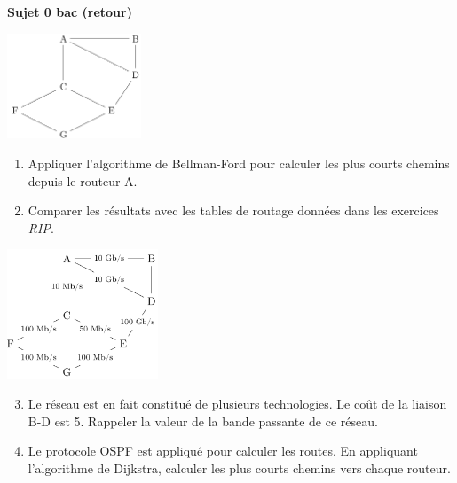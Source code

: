 \documentclass[a4paper,11pt]{article}
\begin{document}
\begin{exo}\textbf{Sujet 0 bac (retour)}\\
\begin{center}
\centering
\includegraphics[width=4cm]{ressources/exo-bac.png}
\end{center}
\begin{enumerate}
    \item Appliquer l'algorithme de Bellman-Ford pour calculer les plus courts chemins depuis le routeur A.
    \item Comparer les résultats avec les tables de routage données dans les exercices \emph{RIP}.
\end{enumerate}
\begin{center}
    \centering
    \includegraphics[width=4.5cm]{ressources/bacblanc.png}
    \end{center}
    \begin{enumerate}
        \setcounter{enumi}{2}
        \item Le réseau est en fait constitué de plusieurs technologies. Le coût de la liaison B-D est 5. Rappeler la valeur de la bande passante de ce réseau.
        \item Le protocole OSPF est appliqué pour calculer les routes. En appliquant l'algorithme de Dijkstra, calculer les plus courts chemins vers chaque routeur.
    \end{enumerate}
\end{exo}
\end{document}
